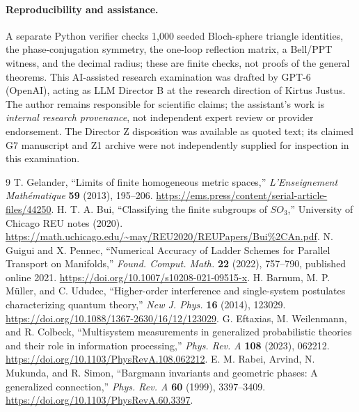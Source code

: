 \documentclass[11pt,letterpaper]{article}
\begin{document}
\paragraph{Reproducibility and assistance.} A separate Python verifier checks 1,000 seeded Bloch-sphere triangle identities, the phase-conjugation symmetry, the one-loop reflection matrix, a Bell/PPT witness, and the decimal radius; these are finite checks, not proofs of the general theorems. This AI-assisted research examination was drafted by GPT-6 (OpenAI), acting as LLM Director B at the research direction of Kirtus Justus. The author remains responsible for scientific claims; the assistant's work is \emph{internal research provenance}, not independent expert review or provider endorsement. The Director Z disposition was available as quoted text; its claimed G7 manuscript and Z1 archive were not independently supplied for inspection in this examination.

\begin{thebibliography}{9}\setlength{\itemsep}{2pt}
 T. Gelander, ``Limits of finite homogeneous metric spaces,'' \emph{L'Enseignement Math\'ematique} \textbf{59} (2013), 195--206. \url{https://ems.press/content/serial-article-files/44250}.
 H. T. A. Bui, ``Classifying the finite subgroups of $SO_3$,'' University of Chicago REU notes (2020). \url{https://math.uchicago.edu/~may/REU2020/REUPapers/Bui%2CAn.pdf}.
 N. Guigui and X. Pennec, ``Numerical Accuracy of Ladder Schemes for Parallel Transport on Manifolds,'' \emph{Found. Comput. Math.} \textbf{22} (2022), 757--790, published online 2021. \url{https://doi.org/10.1007/s10208-021-09515-x}.
 H. Barnum, M. P. M\"uller, and C. Ududec, ``Higher-order interference and single-system postulates characterizing quantum theory,'' \emph{New J. Phys.} \textbf{16} (2014), 123029. \url{https://doi.org/10.1088/1367-2630/16/12/123029}.
 G. Eftaxias, M. Weilenmann, and R. Colbeck, ``Multisystem measurements in generalized probabilistic theories and their role in information processing,'' \emph{Phys. Rev. A} \textbf{108} (2023), 062212. \url{https://doi.org/10.1103/PhysRevA.108.062212}.
 E. M. Rabei, Arvind, N. Mukunda, and R. Simon, ``Bargmann invariants and geometric phases: A generalized connection,'' \emph{Phys. Rev. A} \textbf{60} (1999), 3397--3409. \url{https://doi.org/10.1103/PhysRevA.60.3397}.
\end{thebibliography}
\end{document}
